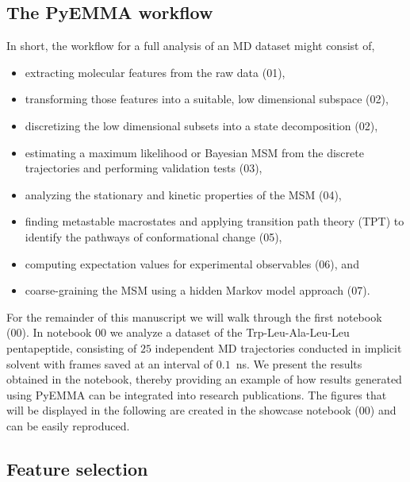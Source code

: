 \documentclass[9pt,tutorial]{livecoms}
\begin{document}
\subsection{The PyEMMA workflow}

In short, the workflow for a full analysis of an MD dataset might consist of,
\begin{itemize}
	\item extracting molecular features from the raw data (01),
	\item transforming those features into a suitable, low dimensional subspace (02),
	\item discretizing the low dimensional subsets into a state decomposition (02),
	\item estimating a maximum likelihood or Bayesian MSM from the discrete trajectories and performing validation tests (03),
	\item analyzing the stationary and kinetic properties of the MSM (04),
	\item finding metastable macrostates and applying transition path theory (TPT) to identify the pathways of conformational change (05),
	\item computing expectation values for experimental observables (06), and
	\item coarse-graining the MSM using a hidden Markov model approach (07).
\end{itemize}

For the remainder of this manuscript we will walk through the first notebook (00). In notebook 00 we analyze a dataset of the Trp-Leu-Ala-Leu-Leu pentapeptide, consisting of $25$ independent MD trajectories conducted in implicit solvent with frames saved at an interval of $0.1$~ns. We present the results obtained in the notebook, thereby providing an example of how results generated using PyEMMA can be integrated into research publications.
The figures that will be displayed in the following are created in the showcase notebook (00) and can be easily reproduced.

\subsection{Feature selection}
\end{document}
